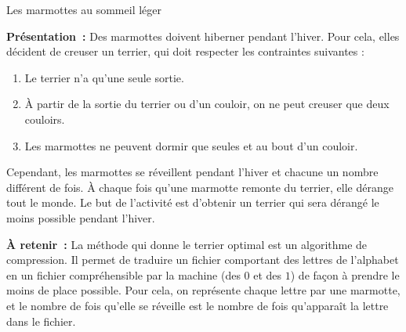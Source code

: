 \documentclass[a4paper,11pt]{article}
\begin{document}
 
 
\begin{center}
\huge
Les marmottes au sommeil léger
\end{center}

\textbf{Présentation~:}
Des marmottes doivent hiberner pendant l'hiver. Pour cela, elles décident de creuser un terrier, qui doit respecter les contraintes suivantes :
\begin{enumerate}
	\item Le terrier n'a qu'une seule sortie.
	\item \`A partir de la sortie du terrier ou d'un couloir, on ne peut creuser que deux couloirs.
	\item Les marmottes ne peuvent dormir que seules et au bout d'un couloir.
\end{enumerate}
Cependant, les marmottes se réveillent pendant l'hiver et chacune un nombre différent de fois. \`A chaque fois qu'une marmotte remonte du terrier, elle dérange tout le monde. Le but de l'activité est d'obtenir un terrier qui sera dérangé le moins possible pendant l'hiver.

\textbf{\`A retenir~:} 
La méthode qui donne le terrier optimal est un algorithme de compression. Il permet de traduire un fichier comportant des lettres de l'alphabet en un fichier compréhensible par la machine (des $0$ et des $1$) de façon à prendre le moins de place possible. Pour cela, on représente chaque lettre par une marmotte, et le nombre de fois qu'elle se réveille est le nombre de fois qu'apparaît la lettre dans le fichier.
\end{document}
